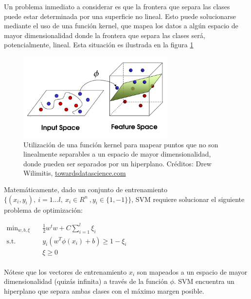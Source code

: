 Un problema inmediato a considerar es que la frontera que separa las clases puede estar determinada por una superficie no lineal. Esto puede solucionarse mediante el uso de una función kernel, que mapea los datos a algún espacio de mayor dimensionalidad donde la frontera que separa las clases será, potencialmente, lineal. Esta situación es ilustrada en la figura \ref{fig:svm_4}\\

\begin{figure}[h!]
\begin{center}
  \includegraphics[width=0.7\textwidth]{Kap1/svm5.png} 
  \end{center}
 \caption{ Utilización de una función kernel para mapear puntos que no son linealmente separables a un espacio de mayor dimensionalidad, donde pueden ser separados por un hiperplano. Créditos: Drew Wilimitis, \url{towardsdatascience.com} }
\label{fig:svm_4}
\end{figure}

Matemáticamente, dado un conjunto de entrenamiento $\{ (x_i,y_i), \ i=1 \ldots l, \ x_i \in R^n \ , y_i \in \{1,-1\} \}$, SVM requiere solucionar el siguiente problema de optimización:

\begin{center}
$\begin{aligned}
\min_{w,b,\xi} \quad & \frac{1}{2}w^{t}w+C\sum_{i=1}^{l}{\xi_{i}}\\
\textrm{s.t.} \quad & y_{i}(w^T\phi(x_{i})+b) \geq 1 - \xi_{i}\\
  &\xi\geq0    \\
\end{aligned}
$
\end{center}

Nótese que los vectores de entrenamiento $x_i$ son mapeados a un espacio de mayor dimensionalidad (quizás infinita) a través de la función $\phi$. SVM encuentra un hiperplano que separa ambas clases con el máximo margen posible. \\

